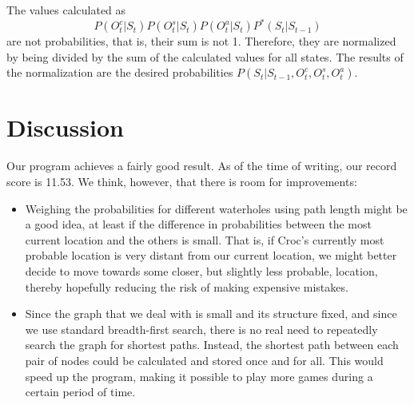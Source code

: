 \documentclass[a4paper]{article}
\begin{document}
The values calculated as
\begin{equation*}
  P(O^c_t|S_t)P(O^s_t|S_t)P(O^a_t|S_t)P^*(S_t|S_{t-1})
\end{equation*}
are not probabilities, that is, their sum is not 1. Therefore, they are
normalized by being divided by the sum of the calculated values for all
states. The results of the normalization are the desired probabilities $P(S_t|S_{t-1}, O^c_t, O^s_t, O^a_t)$.

\section{Discussion}

Our program achieves a fairly good result. As of the time of writing, our
record score is 11.53. We think, however, that there is room for improvements:
\begin{itemize}
\item Weighing the probabilities for different waterholes using path length
  might be a good idea, at least if the difference in probabilities between
  the most current location and the others is small. That is, if Croc's currently most probable location is
  very distant from our current location, we might better decide to move
  towards some closer, but slightly less probable, location, thereby hopefully
  reducing the risk of making expensive mistakes.
\item Since the graph that we deal with is small and its structure fixed, and since we use standard breadth-first
  search, there is no real need to repeatedly search the graph for shortest
  paths. Instead, the shortest path between each pair of nodes could be
  calculated and stored once and for all. This would speed up the program,
  making it possible to play more games during a certain period of time.
\end{itemize}
\end{document}
